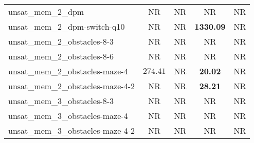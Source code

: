 \begin{tabular}{lcccc}
unsat\_mem\_2\_dpm & NR & NR & NR & NR \\
unsat\_mem\_2\_dpm-switch-q10 & NR & NR & \textbf{1330.09} & NR \\
unsat\_mem\_2\_obstacles-8-3 & NR & NR & NR & NR \\
unsat\_mem\_2\_obstacles-8-6 & NR & NR & NR & NR \\
unsat\_mem\_2\_obstacles-maze-4 & $274.41$ & NR & \textbf{20.02} & NR \\
unsat\_mem\_2\_obstacles-maze-4-2 & NR & NR & \textbf{28.21} & NR \\
unsat\_mem\_3\_obstacles-8-3 & NR & NR & NR & NR \\
unsat\_mem\_3\_obstacles-maze-4 & NR & NR & NR & NR \\
unsat\_mem\_3\_obstacles-maze-4-2 & NR & NR & NR & NR \\
\bottomrule
\end{tabular}
